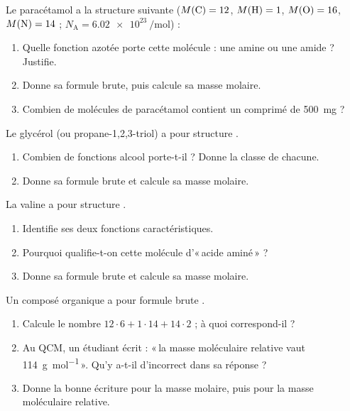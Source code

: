 \documentclass[11pt,a4paper]{article}
\begin{document}
\begin{exo}
Le paracétamol a la structure suivante ($M(\ce{C})=12$, $M(\ce{H})=1$, $M(\ce{O})=16$, $M(\ce{N})=14$ ; $N_{\mathrm{A}}=\qty{6.02e23}{\per\mole}$) :
\begin{center}
\end{center}
\begin{enumerate}[label=\alph*)]
  \item Quelle fonction azotée porte cette molécule : une amine ou une amide ? Justifie.
  \item Donne sa formule brute, puis calcule sa masse molaire.
  \item Combien de molécules de paracétamol contient un comprimé de \qty{500}{\milli\gram} ?
\end{enumerate}
\end{exo}

\begin{exo}
Le glycérol (ou propane-1,2,3-triol) a pour structure .
\begin{enumerate}[label=\alph*)]
  \item Combien de fonctions alcool porte-t-il ? Donne la classe de chacune.
  \item Donne sa formule brute et calcule sa masse molaire.
\end{enumerate}
\end{exo}

\begin{exo}
La valine a pour structure .
\begin{enumerate}[label=\alph*)]
  \item Identifie ses deux fonctions caractéristiques.
  \item Pourquoi qualifie-t-on cette molécule d'«\,acide aminé\,» ?
  \item Donne sa formule brute et calcule sa masse molaire.
\end{enumerate}
\end{exo}

\begin{exo}
Un composé organique a pour formule brute .
\begin{enumerate}[label=\alph*)]
  \item Calcule le nombre $12\cdot 6 + 1\cdot 14 + 14\cdot 2$ ; à quoi correspond-il ?
  \item Au QCM, un étudiant écrit : «\,la masse moléculaire relative vaut \qty{114}{\gram\per\mole}\,». Qu'y a-t-il d'incorrect dans sa réponse ?
  \item Donne la bonne écriture pour la masse molaire, puis pour la masse moléculaire relative.
\end{enumerate}
\end{exo}
\end{document}
